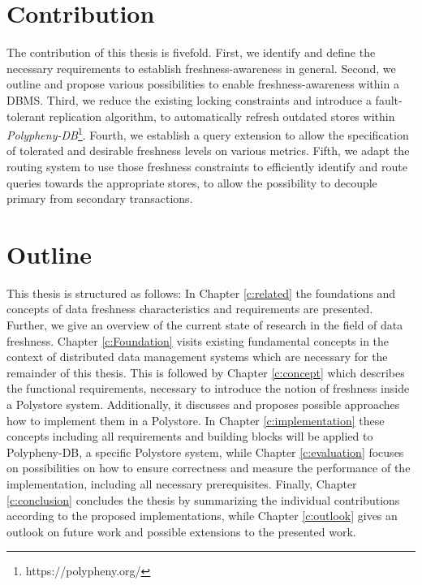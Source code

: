 
\section{Contribution}
The contribution of this thesis is fivefold. First, we identify and define the necessary requirements to establish freshness-awareness in general.
Second, we outline and propose various possibilities to enable freshness-awareness within a DBMS. Third, we reduce the existing locking constraints and 
introduce a fault-tolerant replication algorithm, to automatically refresh outdated stores within \emph{Polypheny-DB}\footnote{https://polypheny.org/}. 
Fourth, we establish a query extension to allow the specification of tolerated and desirable freshness levels 
on various metrics. Fifth, we adapt the routing system to use those freshness constraints to efficiently identify and route queries towards the appropriate stores, 
to allow the possibility to decouple primary from secondary transactions.




\section{Outline}
This thesis is structured as follows:
In Chapter \ref{c:related} the foundations and concepts of data freshness characteristics and requirements are presented.
Further, we give an overview of the current state of research in the field of data freshness. 
Chapter \ref{c:Foundation} visits existing fundamental concepts in the context of distributed data management systems 
which are necessary for the remainder of this thesis. 
This is followed by Chapter \ref{c:concept} which describes the functional requirements, necessary to introduce the notion of freshness inside a Polystore system. 
Additionally, it discusses and proposes possible approaches how to implement them in a Polystore. 
In Chapter \ref{c:implementation} these concepts including all requirements and building blocks will be applied to Polypheny-DB, a specific Polystore system,
while Chapter \ref{c:evaluation} focuses on possibilities on how to ensure correctness and measure the performance of the implementation, including all necessary prerequisites.
Finally, Chapter \ref{c:conclusion} concludes the thesis by summarizing the individual contributions according to the proposed
implementations, while Chapter \ref{c:outlook} gives an outlook on future work and possible extensions to the presented work.


